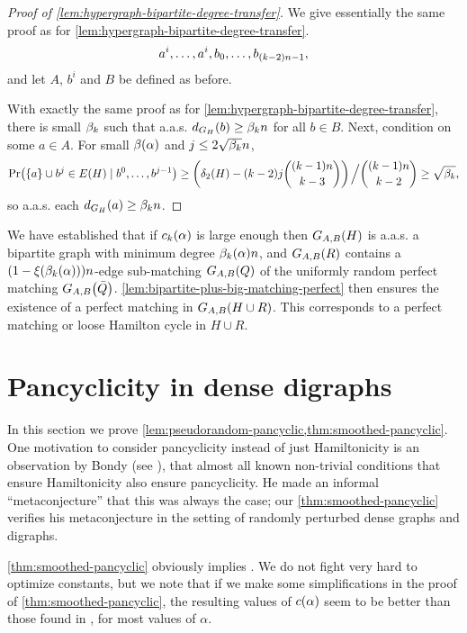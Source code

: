 \documentclass[11pt,english]{article}
\theoremstyle{plain}
\theoremstyle{definition}
\theoremstyle{definition}
\theoremstyle{plain}
\theoremstyle{plain}
\theoremstyle{plain}
\theoremstyle{plain}
\theoremstyle{remark}
\theoremstyle{remark}
\let\originalleft\left
\let\originalright\right
\renewcommand{\left}{\mathopen{}\mathclose\bgroup\originalleft}
\renewcommand{\right}{\aftergroup\egroup\originalright}
\begin{document}
\begin{proof}
[Proof of \ref{lem:hypergraph-bipartite-degree-transfer}]We give
essentially the same proof as for \ref{lem:hypergraph-bipartite-degree-transfer}.
\[
a^{i},\dots,a^{i},b_{0},\dots,b_{\left(k-2\right)n-1},
\]
and let $A$, $b^i$ and $B$ be defined as before.

With exactly the same proof as for \ref{lem:hypergraph-bipartite-degree-transfer},
there is small $\beta_k$ such that a.a.s. $d_{G_{H}}\left(b\right)\ge\aham n$
for all $b\in B$. Next, condition on some $a\in A$. For small $\beta\left(\alpha\right)$
and $j\le2\sqrt{\beta_k}n$,
\[
\Pr\left(\left\{ a\right\} \cup b^{j}\in E\left(H\right)\mid b^{0},\dots,b^{j-1}\right)\ge\left(\delta_{2}\left(H\right)-\left(k-2\right)j{\left(k-1\right)n \choose k-3}\right)\left.\vphantom{\sum}\right/{ \left(k-1\right)n \choose k-2}\ge\sqrt{\aham},
\]
so a.a.s. each $d_{G_{H}}\left(a\right)\ge\aham n$.
\end{proof}
We have established that if $\chyp\left(\alpha\right)$ 
is large enough then $G_{A,B}\left(H\right)$ is a.a.s. a bipartite graph with minimum degree $\a\left(\alpha\right)n$, and $G_{A,B}\left(R\right)$ contains a $\left(1-\xi\left(\a\left(\alpha\right)\right)\right)n$-edge sub-matching $G_{A,B}\left(Q\right)$ of the uniformly random perfect matching $G_{A,B}\left(\bar{Q}\right)$. \ref{lem:bipartite-plus-big-matching-perfect} then
ensures the existence of a perfect matching in $G_{A,B}\left(H\cup R\right)$. This corresponds to a perfect matching or loose Hamilton cycle in $H\cup R$.


\section{\label{sec:digraphs}Pancyclicity in dense digraphs}

In this section we prove \ref{lem:pseudorandom-pancyclic,thm:smoothed-pancyclic}. One motivation to consider pancyclicity instead of just Hamiltonicity is an observation by Bondy (see \cite{Bon75}),
that almost all known non-trivial conditions that ensure Hamiltonicity
also ensure pancyclicity. He made an informal ``metaconjecture''
that this was always the case; our \ref{thm:smoothed-pancyclic} verifies
his metaconjecture in the setting of randomly perturbed dense graphs
and digraphs.

\ref{thm:smoothed-pancyclic} obviously implies \cite[Theorems~1 and~3]{BFM03}.
We do not fight very hard to optimize constants, but we note that
if we make some simplifications in the proof of \ref{thm:smoothed-pancyclic},
the resulting values of $\cdi\left(\alpha\right)$ seem to be better
than those found in \cite{BFM03}, for most values of $\alpha$.
\end{document}
